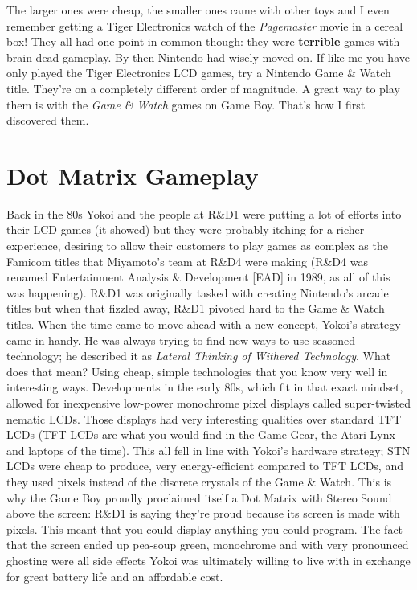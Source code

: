 \documentclass{book}
\let\oldcenter\center
\let\oldendcenter\endcenter
\renewenvironment{center}{\setlength\topsep{0pt}\oldcenter}{\oldendcenter}
\begin{document}
\begin{center}
\quad\vspace{4pt}
\quad\vspace{4pt}
\end{center}

The larger ones were cheap, the smaller ones came with other toys and I even remember getting a Tiger Electronics watch of the \emph{Pagemaster} movie in a cereal box! They all had one point in common though: they were \textbf{terrible} games with brain-dead gameplay. By then Nintendo had wisely moved on. If like me you have only played the Tiger Electronics LCD games, try a Nintendo Game \& Watch title. They’re on a completely different order of magnitude. A great way to play them is with the \emph{Game \& Watch} games on Game Boy. That’s how I first discovered them.

\FloatBarrier\needspace{10mm}\section*{Dot Matrix Gameplay}\nopagebreak[4]

Back in the 80s Yokoi and the people at R\&D1 were putting a lot of efforts into their LCD games (it showed) but they were probably itching for a richer experience, desiring to allow their customers to play games as complex as the Famicom titles that Miyamoto’s team at R\&D4 were making (R\&D4 was renamed Entertainment Analysis \& Development [EAD] in 1989, as all of this was happening). R\&D1 was originally tasked with creating Nintendo’s arcade titles but when that fizzled away, R\&D1 pivoted hard to the Game \& Watch titles. When the time came to move ahead with a new concept, Yokoi’s strategy came in handy. He was always trying to find new ways to use seasoned technology; he described it as \emph{Lateral Thinking of Withered Technology}. What does that mean? Using cheap, simple technologies that you know very well in interesting ways. Developments in the early 80s, which fit in that exact mindset, allowed for inexpensive low-power monochrome pixel displays called super-twisted nematic LCDs. Those displays had very interesting qualities over standard TFT LCDs (TFT LCDs are what you would find in the Game Gear, the Atari Lynx and laptops of the time). This all fell in line with Yokoi’s hardware strategy; STN LCDs were cheap to produce, very energy-efficient compared to TFT LCDs, and they used pixels instead of the discrete crystals of the Game \& Watch. This is why the Game Boy proudly proclaimed itself a Dot Matrix with Stereo Sound above the screen: R\&D1 is saying they’re proud because its screen is made with pixels. This meant that you could display anything you could program. The fact that the screen ended up pea-soup green, monochrome and with very pronounced ghosting were all side effects Yokoi was ultimately willing to live with in exchange for great battery life and an affordable cost.
\end{document}
